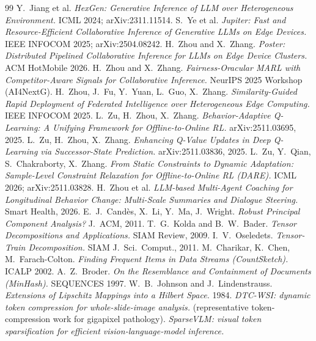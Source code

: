 \documentclass[11pt]{article}
\begin{document}
\begin{thebibliography}{99}
\small
{} Y.~Jiang et al. \emph{HexGen: Generative Inference of LLM over Heterogeneous Environment.} ICML 2024; arXiv:2311.11514.
 S.~Ye et al. \emph{Jupiter: Fast and Resource-Efficient Collaborative Inference of Generative LLMs on Edge Devices.} IEEE INFOCOM 2025; arXiv:2504.08242.
 H.~Zhou and X.~Zhang. \emph{Poster: Distributed Pipelined Collaborative Inference for LLMs on Edge Device Clusters.} ACM HotMobile 2026.
 H.~Zhou and X.~Zhang. \emph{Fairness-Oracular MARL with Competitor-Aware Signals for Collaborative Inference.} NeurIPS 2025 Workshop (AI4NextG).
 H.~Zhou, J.~Fu, Y.~Yuan, L.~Guo, X.~Zhang. \emph{Similarity-Guided Rapid Deployment of Federated Intelligence over Heterogeneous Edge Computing.} IEEE INFOCOM 2025.
 L.~Zu, H.~Zhou, X.~Zhang. \emph{Behavior-Adaptive Q-Learning: A Unifying Framework for Offline-to-Online RL.} arXiv:2511.03695, 2025.
 L.~Zu, H.~Zhou, X.~Zhang. \emph{Enhancing Q-Value Updates in Deep Q-Learning via Successor-State Prediction.} arXiv:2511.03836, 2025.
 L.~Zu, Y.~Qian, S.~Chakraborty, X.~Zhang. \emph{From Static Constraints to Dynamic Adaptation: Sample-Level Constraint Relaxation for Offline-to-Online RL (DARE).} ICML 2026; arXiv:2511.03828.
 H.~Zhou et al. \emph{LLM-based Multi-Agent Coaching for Longitudinal Behavior Change: Multi-Scale Summaries and Dialogue Steering.} Smart Health, 2026.
 E.~J.~Cand\`es, X.~Li, Y.~Ma, J.~Wright. \emph{Robust Principal Component Analysis?} J.~ACM, 2011.
 T.~G.~Kolda and B.~W.~Bader. \emph{Tensor Decompositions and Applications.} SIAM Review, 2009.
 I.~V.~Oseledets. \emph{Tensor-Train Decomposition.} SIAM J.~Sci.~Comput., 2011.
 M.~Charikar, K.~Chen, M.~Farach-Colton. \emph{Finding Frequent Items in Data Streams (CountSketch).} ICALP 2002.
 A.~Z.~Broder. \emph{On the Resemblance and Containment of Documents (MinHash).} SEQUENCES 1997.
 W.~B.~Johnson and J.~Lindenstrauss. \emph{Extensions of Lipschitz Mappings into a Hilbert Space.} 1984.
 \emph{DTC-WSI: dynamic token compression for whole-slide-image analysis.} (representative token-compression work for gigapixel pathology).
 \emph{SparseVLM: visual token sparsification for efficient vision-language-model inference.}
\end{thebibliography}
\end{document}
